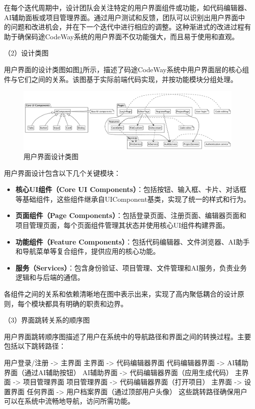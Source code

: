 \documentclass[
    report,     %
    oneside,    %
    UTF8,       %
    zihao=-4    %
]{config} %
\begin{document}
在每个迭代周期中，设计团队会关注特定的用户界面组件或功能，如代码编辑器、AI辅助面板或项目管理界面。通过用户测试和反馈，团队可以识别出用户界面中的问题和改进机会，并在下一个迭代中进行相应的调整。这种渐进式的改进过程有助于确保码途CodeWay系统的用户界面不仅功能强大，而且易于使用和直观。

（2）设计类图

用户界面的设计类图如图\ref{fig:ui-design-class}所示，描述了码途CodeWay系统中用户界面层的核心组件与它们之间的关系。该图基于实际前端代码实现，并按功能模块分组处理。

\begin{figure}[H]
    \centering
    \includegraphics[width=1.0\textwidth]{UML/UIDesignClass.png}
    \caption{用户界面设计类图}
    \label{fig:ui-design-class}
\end{figure}

用户界面设计包含以下几个关键模块：

\begin{itemize}
    \item \textbf{核心UI组件（Core UI Components）}：包括按钮、输入框、卡片、对话框等基础组件，这些组件继承自UIComponent基类，实现了统一的样式和行为。
    \item \textbf{页面组件（Page Components）}：包括登录页面、注册页面、编辑器页面和项目管理页面，每个页面组件管理其状态并使用核心UI组件构建界面。
    \item \textbf{功能组件（Feature Components）}：包括代码编辑器、文件浏览器、AI助手和导航菜单等复合组件，提供应用的核心功能。
    \item \textbf{服务（Services）}：包含身份验证、项目管理、文件管理和AI服务，负责业务逻辑和与后端的通信。
\end{itemize}

各组件之间的关系和依赖清晰地在图中表示出来，实现了高内聚低耦合的设计原则，每个模块都具有明确的职责和边界。

（3）界面跳转关系的顺序图

用户界面跳转顺序图描述了用户在系统中的导航路径和界面之间的转换过程。主要包括以下跳转路径：

用户登录/注册 -> 主界面
主界面 -> 代码编辑器界面
代码编辑器界面 -> AI辅助界面（通过AI辅助按钮）
AI辅助界面 -> 代码编辑器界面（应用生成代码）
主界面 -> 项目管理界面
项目管理界面 -> 代码编辑器界面（打开项目）
主界面 -> 设置界面
任何界面 -> 用户档案界面（通过顶部用户头像）
这些跳转路径确保用户可以在系统中流畅地导航，访问所需功能。
\end{document}
